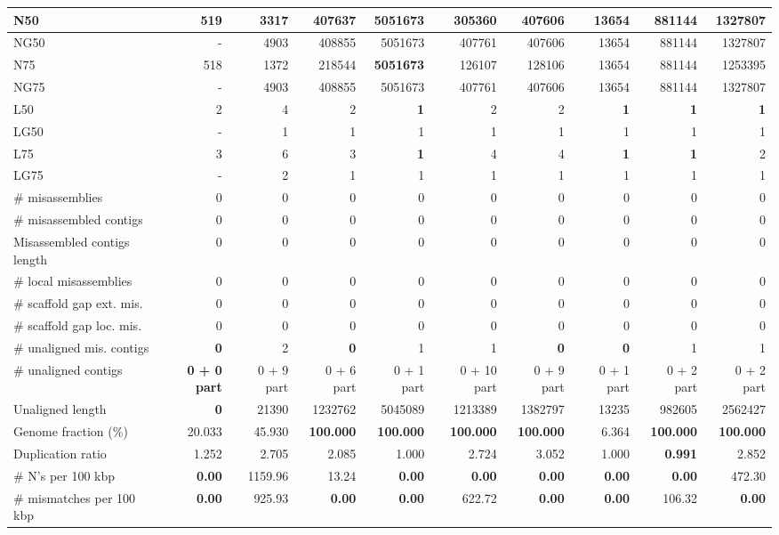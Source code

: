 \documentclass[12pt,a4paper]{article}
\begin{document}
\begin{table}[ht]
\begin{center}
\begin{tabular}{|l*{9}{|r}|}
N50 & 519 & 3317 & 407637 & {\bf 5051673} & 305360 & 407606 & 13654 & 881144 & 1327807 \\ \hline
NG50 & - & 4903 & 408855 & 5051673 & 407761 & 407606 & 13654 & 881144 & 1327807 \\ \hline
N75 & 518 & 1372 & 218544 & {\bf 5051673} & 126107 & 128106 & 13654 & 881144 & 1253395 \\ \hline
NG75 & - & 4903 & 408855 & 5051673 & 407761 & 407606 & 13654 & 881144 & 1327807 \\ \hline
L50 & 2 & 4 & 2 & {\bf 1} & 2 & 2 & {\bf 1} & {\bf 1} & {\bf 1} \\ \hline
LG50 & - & 1 & 1 & 1 & 1 & 1 & 1 & 1 & 1 \\ \hline
L75 & 3 & 6 & 3 & {\bf 1} & 4 & 4 & {\bf 1} & {\bf 1} & 2 \\ \hline
LG75 & - & 2 & 1 & 1 & 1 & 1 & 1 & 1 & 1 \\ \hline
\# misassemblies & 0 & 0 & 0 & 0 & 0 & 0 & 0 & 0 & 0 \\ \hline
\# misassembled contigs & 0 & 0 & 0 & 0 & 0 & 0 & 0 & 0 & 0 \\ \hline
Misassembled contigs length & 0 & 0 & 0 & 0 & 0 & 0 & 0 & 0 & 0 \\ \hline
\# local misassemblies & 0 & 0 & 0 & 0 & 0 & 0 & 0 & 0 & 0 \\ \hline
\# scaffold gap ext. mis. & 0 & 0 & 0 & 0 & 0 & 0 & 0 & 0 & 0 \\ \hline
\# scaffold gap loc. mis. & 0 & 0 & 0 & 0 & 0 & 0 & 0 & 0 & 0 \\ \hline
\# unaligned mis. contigs & {\bf 0} & 2 & {\bf 0} & 1 & 1 & {\bf 0} & {\bf 0} & 1 & 1 \\ \hline
\# unaligned contigs & {\bf 0 + 0 part} & 0 + 9 part & 0 + 6 part & 0 + 1 part & 0 + 10 part & 0 + 9 part & 0 + 1 part & 0 + 2 part & 0 + 2 part \\ \hline
Unaligned length & {\bf 0} & 21390 & 1232762 & 5045089 & 1213389 & 1382797 & 13235 & 982605 & 2562427 \\ \hline
Genome fraction (\%) & 20.033 & 45.930 & {\bf 100.000} & {\bf 100.000} & {\bf 100.000} & {\bf 100.000} & 6.364 & {\bf 100.000} & {\bf 100.000} \\ \hline
Duplication ratio & 1.252 & 2.705 & 2.085 & 1.000 & 2.724 & 3.052 & 1.000 & {\bf 0.991} & 2.852 \\ \hline
\# N's per 100 kbp & {\bf 0.00} & 1159.96 & 13.24 & {\bf 0.00} & {\bf 0.00} & {\bf 0.00} & {\bf 0.00} & {\bf 0.00} & 472.30 \\ \hline
\# mismatches per 100 kbp & {\bf 0.00} & 925.93 & {\bf 0.00} & {\bf 0.00} & 622.72 & {\bf 0.00} & {\bf 0.00} & 106.32 & {\bf 0.00} \\ \hline

\end{tabular}
\end{center}
\end{table}
\end{document}

